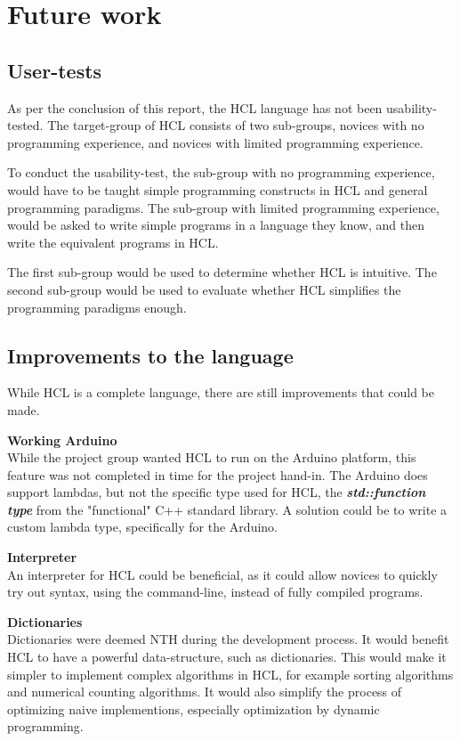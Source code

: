 \section{Future work}
\label{sec:futureWorks}

\subsection{User-tests}
As per the conclusion of this report, the HCL language has not been usability-tested.
The target-group of HCL consists of two sub-groups, novices with no programming experience, and novices with limited programming experience.

To conduct the usability-test, the sub-group with no programming experience, would have to be taught simple programming constructs in HCL and general programming paradigms.
The sub-group with limited programming experience, would be asked to write simple programs in a language they know, and then write the equivalent programs in HCL.

The first sub-group would be used to determine whether HCL is intuitive.
The second sub-group would be used to evaluate whether HCL simplifies the programming paradigms enough.

\subsection{Improvements to the language}
While HCL is a complete language, there are still improvements that could be made.

\textbf{Working Arduino}\\
While the project group wanted HCL to run on the Arduino platform, this feature was not completed in time for the project hand-in.
The Arduino does support lambdas, but not the specific type used for HCL, the \textit{\textbf{std::function type}} from the "functional" C++ standard library.
A solution could be to write a custom lambda type, specifically for the Arduino.

\textbf{Interpreter}\\
An interpreter for HCL could be beneficial, as it could allow novices to quickly try out syntax, using the command-line, instead of fully compiled programs.

\textbf{Dictionaries}\\
Dictionaries were deemed NTH during the development process.
It would benefit HCL to have a powerful data-structure, such as dictionaries.
This would make it simpler to implement complex algorithms in HCL, for example sorting algorithms and numerical counting algorithms.
It would also simplify the process of optimizing naive implementions, especially optimization by dynamic programming.

